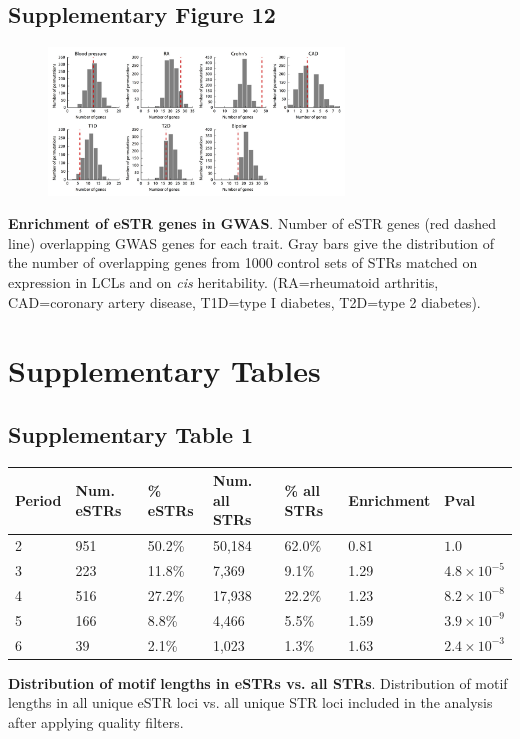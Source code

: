 \pagebreak
\subsection{Supplementary Figure 12}
\begin{figure}[h!]
\centering
\label{fig:estrsupfig12}
\includegraphics[width=0.7\textwidth]{Figures/Chapter4/SuppFig12.jpg}
\end{figure}
\textbf{Enrichment of eSTR genes in GWAS}. Number of eSTR genes (red dashed line) overlapping GWAS genes for each trait. Gray bars give the distribution of the number of overlapping genes from 1000 control sets of STRs matched on expression in LCLs and on \emph{cis} heritability. (RA=rheumatoid arthritis, CAD=coronary artery disease, T1D=type I diabetes, T2D=type 2 diabetes).


\pagebreak
\section{Supplementary Tables}

\subsection{Supplementary Table 1}
\label{tab:estrsuptab1}
\begin{table}[h!]
\begin{tabular}{l|l|l|l|l|l|l}
Period & Num. eSTRs & \% eSTRs & Num. all STRs & \% all STRs & Enrichment & Pval\\
\hline
2 & 951 & 50.2\% & 50,184 & 62.0\% & 0.81 & $1.0$\\
3 & 223 & 11.8\% & 7,369 & 9.1\% & 1.29 & $4.8 \times 10^{-5}$\\
4 & 516 & 27.2\% & 17,938 & 22.2\% & 1.23 & $8.2 \times 10^{-8}$\\
5 & 166 & 8.8\% & 4,466 & 5.5\% & 1.59 & $3.9 \times 10^{-9}$\\
6 & 39 & 2.1\% & 1,023 & 1.3\% & 1.63 & $2.4 \times 10^{-3}$\\
\hline
\end{tabular}
\end{table}
\textbf{Distribution of motif lengths in eSTRs vs. all STRs}. Distribution of motif lengths in all unique eSTR loci vs. all unique STR loci included in the analysis after applying quality filters. 

